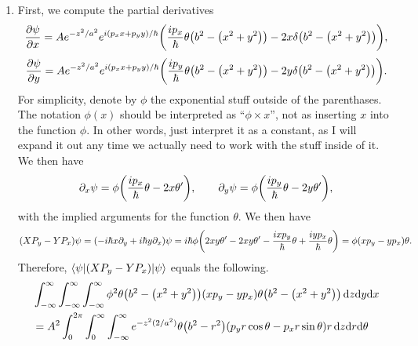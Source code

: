 \documentclass[11pt, letterpaper]{article}
\renewcommand{\left}{\mleft}
\renewcommand{\right}{\mright}
\begin{document}
\begin{enumerate}
\begin{align*}
					      &=A^2a\sqrt{\frac{\pi }{2} } \pi b^2\\
					      &=\frac{A^2ab^2\sqrt{\pi ^3} }{\sqrt{2} } \\
					      &\equiv 1	
		,\end{align*}
		where I have set $\theta ^2=\theta $ due to the fact that
		\[
			\theta \left( b^2-r^2 \right) =
			\begin{cases}
				1,&\left| b \right| \geq \left| r \right| \\
				0,&\left| b \right| <\left| r \right| 
			\end{cases}
		.\]
		It follows that
		\[
			A=\sqrt{\frac{\sqrt{2} }{ab^2\sqrt{\pi ^3} } } 
		.\]
	\item First, we compute the partial derivatives
		\[
			\frac{\partial \psi }{\partial x} =Ae^{-z^2/a^2}  e^{i(p_xx+p_yy) /\hbar }\left( \frac{ip_x}{\hbar } \theta \left( b^2-\left( x^2+y^2 \right)  \right) -2x\delta \left( b^2-\left( x^2+y^2 \right)  \right)  \right) 
		,\]
		\[
			\frac{\partial \psi }{\partial y} =Ae^{-z^2/a^2}  e^{i(p_xx+p_yy) /\hbar }\left( \frac{ip_y}{\hbar } \theta \left( b^2-\left( x^2+y^2 \right)  \right) -2y\delta \left( b^2-\left( x^2+y^2 \right)  \right)  \right) 
		.\]
		For simplicity, denote by $\phi $ the exponential stuff outside of the parenthases. The notation $\phi (x)$ should be interpreted as ``$\phi \times x$'', not as inserting $x$ into the function $\phi $. In other words, just interpret it as a constant, as I will expand it out any time we actually need to work with the stuff inside of it. We then have
		\[
			\partial_x \psi =\phi \left( \frac{ip_x}{\hbar } \theta -2x\theta ' \right) ,\qquad \partial_y \psi =\phi \left( \frac{ip_y}{\hbar } \theta -2y\theta ' \right) 
		,\]
		with the implied arguments for the function $\theta $. We then have
		\[
			\left( XP_y-YP_x \right)\psi  =\left( -i\hbar x \partial_y+i\hbar y \partial _x \right) \psi =i\hbar \phi \left( 2xy\theta '-2xy\theta '-\frac{ixp_y}{\hbar } \theta +\frac{iyp_x}{\hbar } \theta  \right) =\phi (xp_y-yp_x)\theta 
		.\]
		Therefore, $\bra{\psi } \left( XP_y-YP_x \right) \ket{\psi } $ equals the following.
		\begin{align*}
			&\int_{-\infty }^{\infty }\int_{-\infty }^{\infty }\int_{-\infty }^{\infty } \phi^2\theta \left( b^2-\left( x^2+y^2\right)  \right) \left( xp_y-yp_x \right) \theta \left( b^2-\left( x^2+y^2 \right)  \right)  \,\mathrm{d} z \mathrm{d} y \mathrm{d} x\\
			&=A^2\int_{0}^{2\pi}\int_{0}^{\infty }\int_{-\infty }^{\infty } e^{-z^2(2/a^2)} \theta \left( b^2-r^2  \right) \left( p_y r \cos \theta - p_x r \sin \theta  \right)  r\,\mathrm{d} z \mathrm{d} r\mathrm{d} \theta \\

\end{align*}
\end{enumerate}
\end{document}
